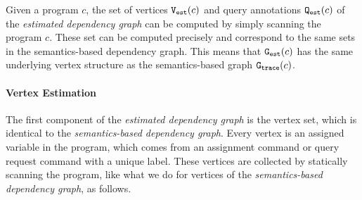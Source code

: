 Given a program $c$, the set of vertices $\mathtt{{V_{est}}}(c)$ and query annotations $\mathtt{{Q_{est}}}(c)$ of the \emph{estimated dependency graph} can be computed by simply
scanning the program $c$. These set can be computed precisely and correspond to
the same sets in the semantics-based dependency graph.
This means that $\mathtt{{G_{est}}}(c)$ has the same underlying vertex structure as 
the semantics-based graph $\mathtt{{G_{trace}}}(c)$. 
\paragraph{Vertex Estimation}
The first component of the \emph{estimated dependency graph} is the vertex set, which is identical to the 
\emph{semantics-based dependency graph}.
Every vertex is an assigned variable in the program, which comes from an assignment command or query request command with a unique label. 
These vertices are collected by statically scanning the program, like what we do for vertices of the \emph{semantics-based dependency graph}, as follows.
%

